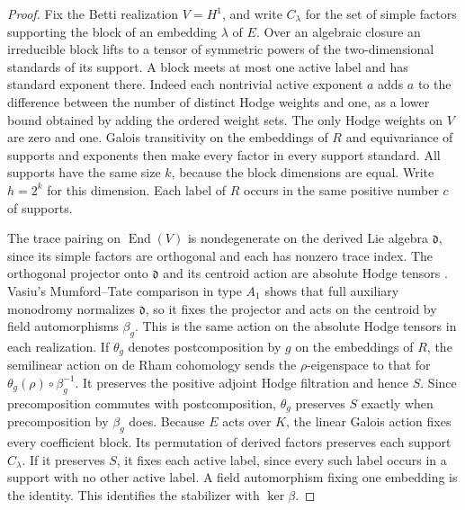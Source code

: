 \begin{proof}
Fix the Betti realization \(V=H^1\), and write \(C_\lambda\) for the
set of simple factors supporting the block of an embedding \(\lambda\)
of \(E\). Over an algebraic closure an irreducible block lifts to a
tensor of symmetric powers of the two-dimensional standards of its
support. A block meets at most one active label and has standard
exponent there. Indeed each nontrivial active exponent \(a\) adds
\(a\) to the difference between the number of distinct Hodge weights
and one, as a lower bound obtained by adding the ordered weight sets.
The only Hodge weights on \(V\) are zero and one. Galois transitivity
on the embeddings of \(R\) and equivariance of supports and exponents
then make every factor in every support standard. All supports have
the same size \(k\), because the block dimensions are equal. Write
\(h=2^k\) for this dimension. Each label of \(R\) occurs in the same
positive number \(c\) of supports.

The trace pairing on \(\operatorname{End}(V)\) is nondegenerate on the
derived Lie algebra \(\mathfrak d\), since its simple factors are
orthogonal and each has nonzero trace index. The orthogonal projector
onto \(\mathfrak d\) and its centroid action are absolute Hodge
tensors \cite[Proposition~2.9 and Theorem~2.11]{delignehodge}.
Vasiu's Mumford--Tate comparison in type \(A_1\)
\cite[Theorem~1.3.4(a) and Example~1.3.5(iv)]{vasiu}
shows that full auxiliary monodromy normalizes \(\mathfrak d\), so it
fixes the projector and acts on the centroid by field automorphisms
\(\beta_g\). This is the same action on the absolute Hodge tensors in
each realization. If \(\theta_g\) denotes postcomposition by \(g\) on
the embeddings of \(R\), the semilinear action on de Rham cohomology
sends the \(\rho\)-eigenspace to that for \(\theta_g(\rho)\circ
\beta_g^{-1}\). It preserves the positive adjoint Hodge filtration
and hence \(S\). Since precomposition commutes with postcomposition,
\(\theta_g\) preserves \(S\) exactly when precomposition by
\(\beta_g\) does. Because \(E\) acts over \(K\), the linear Galois
action fixes every coefficient block. Its permutation of derived
factors preserves each support \(C_\lambda\). If it preserves \(S\),
it fixes each active label, since every such label occurs in a
support with no other active label. A field automorphism fixing
one embedding is the identity. This identifies the stabilizer
with \(\ker\beta\).


\end{proof}
